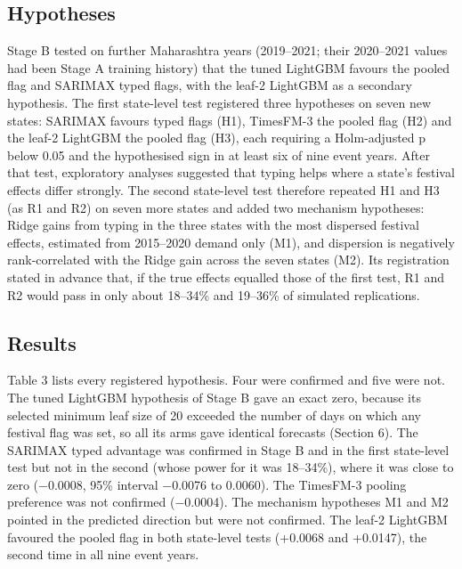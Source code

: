 \documentclass[review,12pt,authoryear]{elsarticle}
\begin{document}
\subsection{Hypotheses}

Stage B tested on further Maharashtra years (2019--2021; their 2020--2021 values had been Stage A training history) that the tuned LightGBM favours the pooled flag and SARIMAX typed flags, with the leaf-2 LightGBM as a secondary hypothesis. The first state-level test registered three hypotheses on seven new states: SARIMAX favours typed flags (H1), TimesFM-3 the pooled flag (H2) and the leaf-2 LightGBM the pooled flag (H3), each requiring a Holm-adjusted p below 0.05 and the hypothesised sign in at least six of nine event years. After that test, exploratory analyses suggested that typing helps where a state's festival effects differ strongly. The second state-level test therefore repeated H1 and H3 (as R1 and R2) on seven more states and added two mechanism hypotheses: Ridge gains from typing in the three states with the most dispersed festival effects, estimated from 2015--2020 demand only (M1), and dispersion is negatively rank-correlated with the Ridge gain across the seven states (M2). Its registration stated in advance that, if the true effects equalled those of the first test, R1 and R2 would pass in only about 18--34\% and 19--36\% of simulated replications.

\subsection{Results}

Table 3 lists every registered hypothesis. Four were confirmed and five were not. The tuned LightGBM hypothesis of Stage B gave an exact zero, because its selected minimum leaf size of 20 exceeded the number of days on which any festival flag was set, so all its arms gave identical forecasts (Section 6). The SARIMAX typed advantage was confirmed in Stage B and in the first state-level test but not in the second (whose power for it was 18--34\%), where it was close to zero (−0.0008, 95\% interval −0.0076 to 0.0060). The TimesFM-3 pooling preference was not confirmed (−0.0004). The mechanism hypotheses M1 and M2 pointed in the predicted direction but were not confirmed. The leaf-2 LightGBM favoured the pooled flag in both state-level tests (+0.0068 and +0.0147), the second time in all nine event years.
\end{document}
